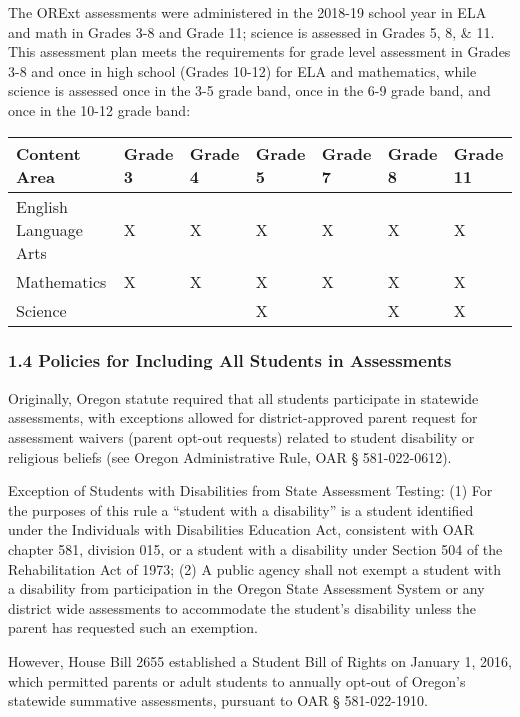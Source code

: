 \documentclass[]{article}
\begin{document}
The ORExt assessments were administered in the 2018-19 school year in
ELA and math in Grades 3-8 and Grade 11; science is assessed in Grades
5, 8, \& 11. This assessment plan meets the requirements for grade level
assessment in Grades 3-8 and once in high school (Grades 10-12) for ELA
and mathematics, while science is assessed once in the 3-5 grade band,
once in the 6-9 grade band, and once in the 10-12 grade band:

\begin{longtable}[]{@{}lllllll@{}}
\toprule
\textbf{Content Area} & \textbf{Grade 3} & \textbf{Grade 4} &
\textbf{Grade 5} & \textbf{Grade 7} & \textbf{Grade 8} & \textbf{Grade
11}\tabularnewline
\midrule
\endhead
English Language Arts & X & X & X & X & X & X\tabularnewline
Mathematics & X & X & X & X & X & X\tabularnewline
Science & & & X & & X & X\tabularnewline
\bottomrule
\end{longtable}

\hypertarget{policies-for-including-all-students-in-assessments}{%
\subsubsection{1.4 Policies for Including All Students in
Assessments}\label{policies-for-including-all-students-in-assessments}}

Originally, Oregon statute required that all students participate in
statewide assessments, with exceptions allowed for district-approved
parent request for assessment waivers (parent opt-out requests) related
to student disability or religious beliefs (see Oregon Administrative
Rule, OAR § 581-022-0612).

Exception of Students with Disabilities from State Assessment Testing:
(1) For the purposes of this rule a ``student with a disability'' is a
student identified under the Individuals with Disabilities Education
Act, consistent with OAR chapter 581, division 015, or a student with a
disability under Section 504 of the Rehabilitation Act of 1973; (2) A
public agency shall not exempt a student with a disability from
participation in the Oregon State Assessment System or any district wide
assessments to accommodate the student's disability unless the parent
has requested such an exemption.

However, House Bill 2655 established a Student Bill of Rights on January
1, 2016, which permitted parents or adult students to annually opt-out
of Oregon's statewide summative assessments, pursuant to OAR §
581-022-1910.
\end{document}
